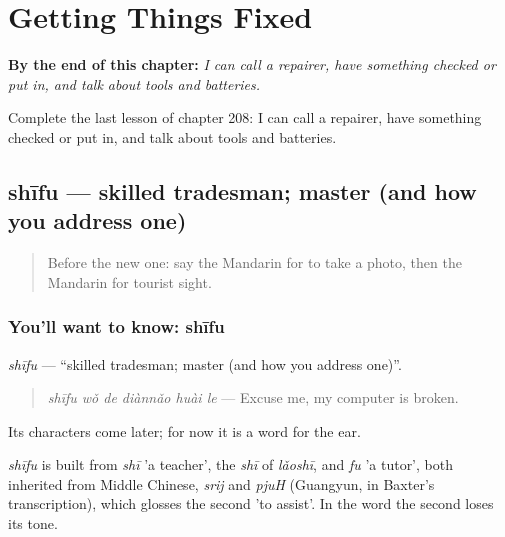 
\chapter{Getting Things Fixed}
\label{ch:zh-getting-things-fixed}

\begin{chapteropening}
\textbf{By the end of this chapter:} \emph{I can call a repairer, have something checked or put in, and talk about tools and batteries.}

Complete the last lesson of chapter 208: I can call a repairer, have something checked or put in, and talk about tools and batteries.
\end{chapteropening}

\section[shīfu]{shīfu — skilled tradesman; master (and how you address one)}

\label{lesson:ZH-C208-shifu}



\begin{quote}
Before the new one: say the Mandarin for to take a photo, then the Mandarin for tourist sight.
\end{quote}

\subsection*{You'll want to know: shīfu}
\emph{shīfu} — \textquotedblleft{}skilled tradesman; master (and how you address one)\textquotedblright{}.

\begin{quote}
\emph{shīfu wǒ de diànnǎo huài le} — Excuse me, my computer is broken.
\end{quote}

Its characters come later; for now it is a word for the ear.

\begin{cousinweb}
\emph{shīfu} is built from \emph{shī} 'a teacher', the \emph{shī} of \emph{lǎoshī}, and \emph{fu} 'a tutor', both inherited from Middle Chinese, \emph{srij} and \emph{pjuH} (Guangyun, in Baxter's transcription), which glosses the second 'to assist'. In the word the second loses its tone.
\end{cousinweb}

